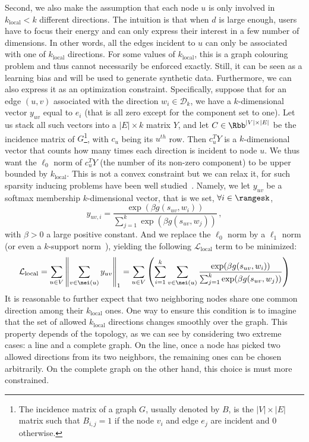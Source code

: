 Second, we also make the assumption that each node $u$ is only involved in $k_\mathrm{local} < k$
different directions. The intuition is that when $d$ is large enough, users have to focus their
energy and can only express their interest in a few number of dimensions. In other words, all the
edges incident to $u$ can only be associated with one of $k_\mathrm{local}$ directions. For
some values of
$k_\mathrm{local}$, this is a \NPc{} graph colouring problem and thus cannot necessarily be enforced
exactly. Still, it can be seen as a learning bias and will be used to generate synthetic data.
Furthermore, we can also express it as an optimization constraint. Specifically, suppose that for
an edge $(u,v)$ associated with the direction $w_i \in \mathcal{D}_k$, we have a $k$-dimensional
vector $y_{uv}$ equal to $e_i$ (that is all zero except for the \ith{} component set to one). Let
us stack all such vectors into a $|E| \times k$ matrix $Y$, and let $C \in \Rbb^{|V| \times |E|}$ be
the incidence matrix of $G$\footnote{The incidence matrix of a graph $G$, usually denoted by $B$, is
the $|V| \times |E|$ matrix such that $B_{i,j} = 1$ if the node $v_i$ and edge $e_j$ are incident
and 0 otherwise.}, with $c_u$ being its $u^{th}$ row. Then $c_u^TY$ is a $k$-dimensional vector that counts
how many times each direction is incident to node $u$. We thus want the $\ell_0$ norm of $c_u^TY$
(\ie the number of its non-zero component) to be upper bounded by $k_\mathrm{local}$.
This is not a convex constraint but we can relax it, for such sparsity inducing problems have been
well studied~\autocite{sparseOptim12}. Namely, we let $y_{uv}$ be a softmax membership
$k$-dimensional vector, that is we set, $\forall i \in \rangesk$,
\begin{equation*}
  y_{uv,i} = \frac{\exp(\beta g(s_{uv}, w_i))}{\sum_{j=1}^k \exp(\beta g(s_{uv}, w_j))}\,,
\end{equation*}
with $\beta>0$ a large
positive constant.  And we replace the $\ell_0$ norm by a $\ell_1$ norm (or even a $k$-support
norm~\autocite{KsupportNorm12}), yielding the following $\mathcal{L}_{\mathrm{local}}$ term to be
minimized:
\begin{equation}
  \label{eq:edge_local_loss}
  \mathcal{L}_{\mathrm{local}} =
  \sum_{u \in V} \left\| \sum_{v \in \nei(u)} y_{uv} \right\|_1 =
  \sum_{u \in V} \left( \sum_{i = 1}^k \sum_{v \in \nei(u)}
  \frac{\exp(\beta g(s_{uv}, w_i))}{\sum_{j=1}^k \exp(\beta g(s_{uv}, w_j))} \right)
\end{equation}
It is reasonable to further expect that two neighboring nodes share one common direction among their
$k_\mathrm{local}$ ones. One way to ensure this condition is to imagine that the set of allowed
$k_\mathrm{local}$ directions changes smoothly over the graph. This property depends of the
topology, as we can see by considering two extreme cases: a line and a complete graph. On the line,
once a node has picked two allowed directions from its two neighbors, the remaining ones can be
chosen arbitrarily. On the complete graph on the other hand, this choice is must more constrained.

